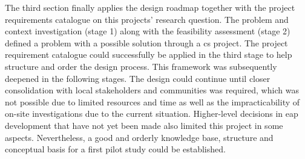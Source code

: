 The third section finally applies the design roadmap together with the project requirements catalogue on this projects' research question. The problem and context investigation (stage 1) along with the feasibility assessment (stage 2) defined a problem with a possible solution through a \acrshort{cs} project. The project requirement catalogue could successfully be applied in the third stage to help structure and order the design process. This framework was subsequently deepened in the following stages. The design could continue until closer consolidation with local stakeholders and communities was required, which was not possible due to limited resources and time as well as the impracticability of on-site investigations due to the current situation. Higher-level decisions in \acrshort{eap} development that have not yet been made also limited this project in some aspects. Nevertheless, a good and orderly knowledge base, structure and conceptual basis for a first pilot study could be established.
